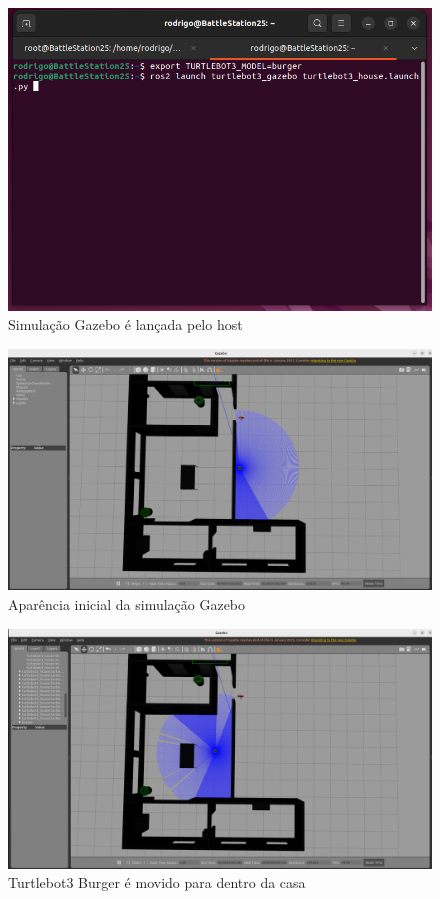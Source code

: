 \begin{figure}[htb]
    \centering
    \includegraphics[width=1\linewidth]{Figures/SimulacaoGazeboLancada.png}
    \caption{Simulação Gazebo é lançada pelo host}
    \label{fig:enter-label}
\end{figure}
\begin{figure}[htb]
    \centering
    \includegraphics[width=1\linewidth]{Figures/GazeboLancado.png}
    \caption{Aparência inicial da simulação Gazebo}
    \label{fig:enter-label}
\end{figure}
\begin{figure}[htb]
    \centering
    \includegraphics[width=1\linewidth]{Figures/BurgerMovido.png}
    \caption{Turtlebot3 Burger é movido para dentro da casa}
    \label{fig:enter-label}
\end{figure}

